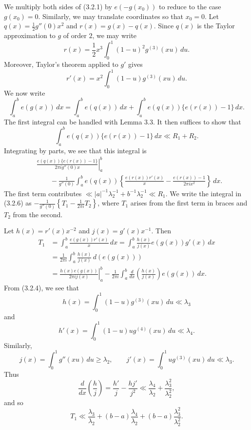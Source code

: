 \documentclass[10pt]{article}
\begin{document}
We multiply both sides of (3.2.1) by $e(-g(x_0))$ to reduce to the case
$g(x_0)=0$. Similarly, we may translate coordinates so that $x_0=0$. Let
$q(x)=\tfrac12g''(0)x^2$ and $r(x)=g(x)-q(x)$. Since $q(x)$ is the Taylor
approximation to $g$ of order $2$, we may write
\begin{equation*}
 r(x)=\frac12x^3\int_0^1(1-u)^2g^{(3)}(xu)\,du. \tag{3.2.3}
\end{equation*}
Moreover, Taylor's theorem applied to $g'$ gives
\begin{equation*}
 r'(x)=x^2\int_0^1(1-u)g^{(3)}(xu)\,du. \tag{3.2.4}
\end{equation*}
We now write
\[
 \int_a^b e(g(x))\,dx
 =\int_a^b e(q(x))\,dx
  +\int_a^b e(q(x))\{e(r(x))-1\}\,dx.
\]
The first integral can be handled with Lemma 3.3. It then suffices to show
that
\begin{equation*}
 \int_a^b e(q(x))\{e(r(x))-1\}\,dx\ll R_1+R_2. \tag{3.2.5}
\end{equation*}
Integrating by parts, we see that this integral is
\begin{align*}
 &\left.\frac{e(q(x))\{e(r(x))-1\}}{2\pi i g''(0)x}\right|_a^b \tag{3.2.6}\\
 &\qquad
 -\frac1{g''(0)}\int_a^b e(q(x))
   \left\{\frac{e(r(x))r'(x)}x
   -\frac{e(r(x))-1}{2\pi i x^2}\right\}\,dx.
\end{align*}
The first term contributes
$\ll |a|^{-1}\lambda_2^{-1}+b^{-1}\lambda_2^{-1}\ll R_1$. We write the
integral in (3.2.6) as $-\frac1{g''(0)}\left\{T_1-\frac1{2\pi i}T_2\right\}$,
where $T_1$ arises from the first term in braces and $T_2$ from the second.

Let $h(x)=r'(x)x^{-2}$ and $j(x)=g'(x)x^{-1}$. Then
\[
\begin{aligned}
 T_1
 &=\int_a^b\frac{e(g(x))r'(x)}x\,dx
  =\int_a^b\frac{h(x)}{j(x)}e(g(x))g'(x)\,dx \\
 &=\frac1{2\pi i}\int_a^b\frac{h(x)}{j(x)}\,d(e(g(x))) \\
 &=\left.\frac{h(x)e(g(x))}{2\pi i j(x)}\right|_a^b
   -\frac1{2\pi i}\int_a^b
       \frac{d}{dx}\left(\frac{h(x)}{j(x)}\right)e(g(x))\,dx.
\end{aligned}
\]
From (3.2.4), we see that
\[
 h(x)=\int_0^1(1-u)g^{(3)}(xu)\,du\ll\lambda_3
\]
and
\[
 h'(x)=\int_0^1(1-u)u g^{(4)}(xu)\,du\ll\lambda_4.
\]
Similarly,
\[
 j(x)=\int_0^1g''(xu)\,du\geq\lambda_2,
 \qquad
 j'(x)=\int_0^1u g^{(3)}(xu)\,du\ll\lambda_3.
\]
Thus
\[
 \frac{d}{dx}\left(\frac hj\right)
 =\frac{h'}j-\frac{hj'}{j^2}
 \ll\frac{\lambda_4}{\lambda_2}
     +\frac{\lambda_3^2}{\lambda_2^2},
\]
and so
\[
 T_1\ll\frac{\lambda_3}{\lambda_2}
 +(b-a)\frac{\lambda_4}{\lambda_2}
 +(b-a)\frac{\lambda_3^2}{\lambda_2^2}.
\]
\end{document}
